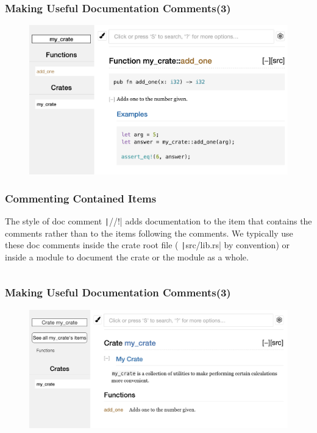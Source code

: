 \documentclass{beamer}
\begin{document}
\begin{frame}[fragile]
\frametitle{Making Useful Documentation Comments(3)}

\begin{figure}
	\centering
	\includegraphics[width=0.99\linewidth]{img/trpl14-01}
\end{figure}

\end{frame} 

\begin{frame}[fragile]
\frametitle{Commenting Contained Items}
The style of doc comment \texttt|//!| adds documentation to the item that contains the comments rather than to the items following the comments. We typically use these doc comments inside the crate root file ( \texttt|src/lib.rs| by convention) or inside a module to document the crate or the module as a whole.

\inputminted[fontsize=\scriptsize]{rust}{./code/documentation2.rs}

\end{frame} 



\begin{frame}[fragile]
	\frametitle{Making Useful Documentation Comments(3)}
	
	\begin{figure}
		\centering
		\includegraphics[width=0.99\linewidth]{img/trpl14-02}
	\end{figure}
	
\end{frame} 
\end{document}
